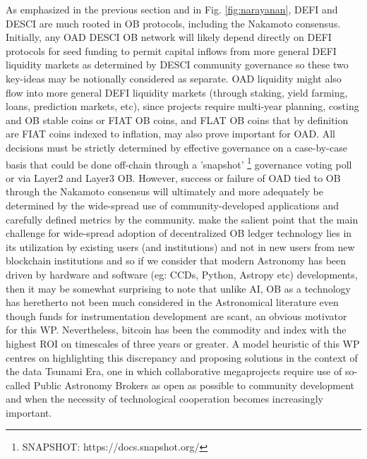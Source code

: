 \documentclass[final,5p,times,twocolumn,authoryear]{elsarticle}
\begin{document}
As emphasized in the previous section and in Fig. \ref{fig:narayanan}, DEFI and DESCI are much rooted in OB protocols, including the Nakamoto consensus. Initially, any OAD DESCI OB network will likely depend directly on DEFI protocols for seed funding to permit capital inflows from more general DEFI liquidity markets as determined by DESCI community governance so these two key-ideas may be notionally considered as separate. OAD liquidity might also flow into more general DEFI liquidity markets (through staking, yield farming, loans, prediction markets, etc), since projects require multi-year planning, costing and OB stable coins or FIAT OB coins, and FLAT OB coins that by definition are FIAT coins indexed to inflation, may also prove important for OAD. All decisions must be strictly determined by effective governance on a case-by-case basis that could be done off-chain through a 'snapshot' \footnote{SNAPSHOT: https://docs.snapshot.org/} governance voting poll or via Layer2 and Layer3 OB. However, success or failure of OAD tied to OB through the Nakamoto consensus will ultimately and more adequately be determined by the wide-spread use of community-developed applications and carefully defined metrics by the community. \cite{arvindandclark2017} make the salient point that the main challenge for wide-spread adoption of decentralized OB ledger technology lies in its utilization by existing users (and institutions) and not in new users from new blockchain institutions and so if we consider that modern Astronomy has been driven by hardware and software (eg: CCDs, Python, Astropy etc) developments, then it may be somewhat surprising to note that unlike AI, OB as a technology has heretherto not been much considered in the Astronomical literature even though funds for instrumentation development are scant, an obvious motivator for this WP. Nevertheless, bitcoin has been the commodity and index with the highest ROI on timescales of three years or greater. A model heuristic of this WP centres on highlighting this discrepancy and proposing solutions in the context of the data Tsunami Era, one in which collaborative megaprojects require use of so-called Public Astronomy Brokers as open as possible to community development and when the necessity of technological cooperation becomes increasingly important.  
\end{document}
